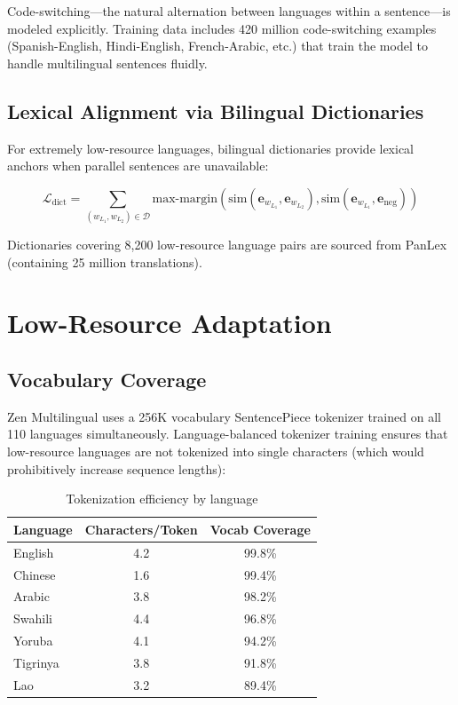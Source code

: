 \documentclass[11pt,a4paper]{article}
\begin{document}
Code-switching—the natural alternation between languages within a sentence—is modeled explicitly. Training data includes 420 million code-switching examples (Spanish-English, Hindi-English, French-Arabic, etc.) that train the model to handle multilingual sentences fluidly.

\subsection{Lexical Alignment via Bilingual Dictionaries}

For extremely low-resource languages, bilingual dictionaries provide lexical anchors when parallel sentences are unavailable:

\begin{equation}
\mathcal{L}_{\text{dict}} = \sum_{(w_{L_1}, w_{L_2}) \in \mathcal{D}} \text{max-margin}\!\left(\text{sim}(\mathbf{e}_{w_{L_1}}, \mathbf{e}_{w_{L_2}}), \text{sim}(\mathbf{e}_{w_{L_1}}, \mathbf{e}_{\text{neg}})\right)
\end{equation}

Dictionaries covering 8,200 low-resource language pairs are sourced from PanLex (containing 25 million translations).

\section{Low-Resource Adaptation}

\subsection{Vocabulary Coverage}

Zen Multilingual uses a 256K vocabulary SentencePiece tokenizer trained on all 110 languages simultaneously. Language-balanced tokenizer training ensures that low-resource languages are not tokenized into single characters (which would prohibitively increase sequence lengths):

\begin{table}[H]
\centering
\caption{Tokenization efficiency by language}
\label{tab:tokenization}
\begin{tabular}{lcc}
\toprule
Language & Characters/Token & Vocab Coverage \\
\midrule
English & 4.2 & 99.8\% \\
Chinese & 1.6 & 99.4\% \\
Arabic & 3.8 & 98.2\% \\
Swahili & 4.4 & 96.8\% \\
Yoruba & 4.1 & 94.2\% \\
Tigrinya & 3.8 & 91.8\% \\
Lao & 3.2 & 89.4\% \\
\bottomrule
\end{tabular}
\end{table}
\end{document}
